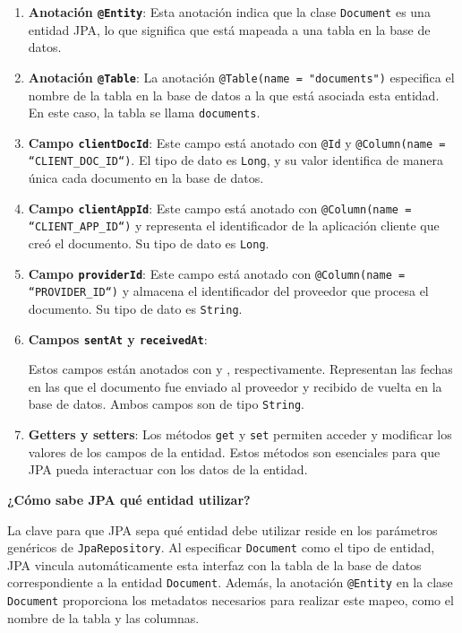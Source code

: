 \documentclass[draft]{scrbook}
\begin{document}
\begin{enumerate}
\item \textbf{Anotación \texttt{@Entity}}:
Esta anotación indica que la clase \texttt{Document} es una entidad JPA, lo que significa que está mapeada a una tabla en la base de datos.

\item \textbf{Anotación \texttt{@Table}}: 
La anotación \texttt{@Table(name = "documents")} especifica el nombre de la tabla en la base de datos a la que está asociada esta entidad. En este caso, la tabla se llama \texttt{documents}.

\item \textbf{Campo \texttt{clientDocId}}: 
Este campo está anotado con \texttt{@Id} y \texttt{@Column(name = ``CLIENT\_DOC\_ID``)}. El tipo de dato es \texttt{Long}, y su valor identifica de manera única cada documento en la base de datos.

\item \textbf{Campo \texttt{clientAppId}}: 
Este campo está anotado con \texttt{@Column(name = ``CLIENT\_APP\_ID``)} y representa el identificador de la aplicación cliente que creó el documento. Su tipo de dato es \texttt{Long}.

\item \textbf{Campo \texttt{providerId}}: 
Este campo está anotado con \texttt{@Column(name = ``PROVIDER\_ID``)} y almacena el identificador del proveedor que procesa el documento. Su tipo de dato es \texttt{String}.

\item \textbf{Campos \texttt{sentAt} y \texttt{receivedAt}}: 

Estos campos están anotados con  y , respectivamente. 
Representan las fechas en las que el documento fue enviado al proveedor y recibido de vuelta en la base de datos. Ambos campos son de tipo \texttt{String}.

\item \textbf{Getters y setters}: 
Los métodos \texttt{get} y \texttt{set} permiten acceder y modificar los valores de los campos de la entidad. Estos métodos son esenciales para que JPA pueda interactuar con los datos de la entidad.

\end{enumerate}

\textbf{¿Cómo sabe JPA qué entidad utilizar?}

La clave para que JPA sepa qué entidad debe utilizar reside en los parámetros genéricos de \texttt{JpaRepository}. Al especificar \texttt{Document} como el tipo de entidad, JPA vincula automáticamente esta interfaz con la tabla de la base de datos correspondiente a la entidad \texttt{Document}. Además, la anotación \texttt{@Entity} en la clase \texttt{Document} proporciona los metadatos necesarios para realizar este mapeo, como el nombre de la tabla y las columnas.
\end{document}
